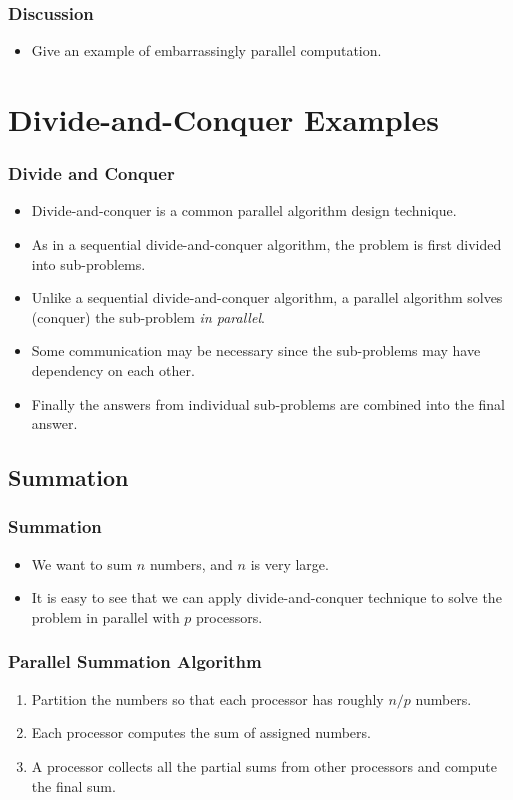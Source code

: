 \documentclass{beamer}
\begin{document}
\begin{CJK}{UTF8}{bsmi}
\begin{frame}
\frametitle{Discussion}
\begin{itemize}
\item Give an example of embarrassingly parallel computation.
\end{itemize}
\end{frame}

\section{Divide-and-Conquer Examples}

\begin{frame}
\frametitle{Divide and Conquer}
\begin{itemize}
\item Divide-and-conquer is a common parallel algorithm design
  technique.
\item As in a sequential divide-and-conquer algorithm, the problem is
  first divided into sub-problems.
\item Unlike a sequential divide-and-conquer algorithm, a parallel
  algorithm solves (conquer) the sub-problem {\em in parallel}.
\item Some communication may be necessary since the sub-problems may
  have dependency on each other.
\item Finally the answers from individual sub-problems are combined
  into the final answer.
\end{itemize}
\end{frame}


\subsection{Summation}

\begin{frame}
\frametitle{Summation}
\begin{itemize}
\item We want to sum $n$ numbers, and $n$ is very large.
\item It is easy to see that we can apply divide-and-conquer technique
  to solve the problem in parallel with $p$ processors.
\end{itemize}
\end{frame}

\begin{frame}
\frametitle{Parallel Summation Algorithm}
\begin{enumerate}
\item Partition the numbers so that each processor has roughly $n/p$
  numbers.
\item Each processor computes the sum of assigned numbers.
\item A processor collects all the partial sums from other processors
  and compute the final sum.
\end{enumerate}
\end{frame}


\end{CJK}
\end{document}
